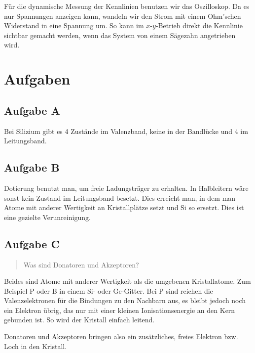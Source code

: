Für die dynamische Messung der Kennlinien benutzen wir das Oszilloskop. Da es
nur Spannungen anzeigen kann, wandeln wir den Strom mit einem Ohm'schen
Widerstand in eine Spannung um. So kann im $x$-$y$-Betrieb direkt die Kennlinie
sichtbar gemacht werden, wenn das System von einem Sägezahn angetrieben wird.


\section{Aufgaben}

\subsection{Aufgabe A}

Bei Silizium gibt es 4 Zustände im Valenzband, keine in der Bandlücke und 4 im
Leitungsband.

\subsection{Aufgabe B}

Dotierung benutzt man, um freie Ladungsträger zu erhalten. In Halbleitern wäre
sonst kein Zustand im Leitungsband besetzt. Dies erreicht man, in dem man Atome
mit anderer Wertigkeit an Kristallplätze setzt und Si so ersetzt. Dies ist eine
gezielte Verunreinigung.

\subsection{Aufgabe C}

\begin{quote}
	Was sind Donatoren und Akzeptoren?
\end{quote}

Beides sind Atome mit anderer Wertigkeit als die umgebenen Kristallatome. Zum
Beispiel P oder B in einem Si- oder Ge-Gitter. Bei P sind reichen die
Valenzelektronen für die Bindungen zu den Nachbarn aus, es bleibt jedoch noch
ein Elektron übrig, das nur mit einer kleinen Ionisationsenergie an den Kern
gebunden ist. So wird der Kristall einfach leitend.

Donatoren und Akzeptoren bringen also ein zusätzliches, freies Elektron bzw.
Loch in den Kristall. \cite[§~18.4.2]{meschede-gerthsen_24}


